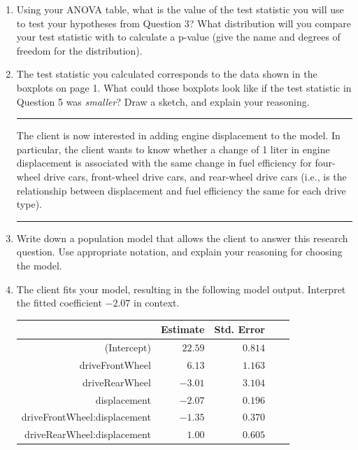 \documentclass[11pt]{article}
\begin{document}
\begin{enumerate}
\vspace{5cm}

\item Using your ANOVA table, what is the value of the test statistic you will use to test your hypotheses from Question 3? What distribution will you compare your test statistic with to calculate a p-value (give the name and degrees of freedom for the distribution).

\vspace{3cm}

\item The test statistic you calculated corresponds to the data shown in the boxplots on page 1. What could those boxplots look like if the test statistic in Question 5 was \textit{smaller}? Draw a sketch, and explain your reasoning.

\pagebreak

\rule{\textwidth}{1pt}

The client is now interested in adding engine displacement to the model. In particular, the client wants to know whether a change of 1 liter in engine displacement is associated with the same change in fuel efficiency for four-wheel drive cars, front-wheel drive cars, and rear-wheel drive cars (i.e., is the relationship between displacement and fuel efficiency the same for each drive type).

\rule{\textwidth}{1pt}

\item Write down a population model that allows the client to answer this research question. Use appropriate notation, and explain your reasoning for choosing the model.

\vspace{3cm}

\item The client fits your model, resulting in the following model output. Interpret the fitted coefficient $-2.07$ in context.

\begin{center}
\begin{tabular}{rrrrr}
  \hline
             & Estimate & Std. Error \\
  \hline
(Intercept)    & $22.59$ & $0.814$    \\
 driveFrontWheel    & $6.13$ & $1.163$ \\
 driveRearWheel & $-3.01$ & $3.104$ \\
 displacement & $-2.07$ & $0.196$ \\
 driveFrontWheel:displacement & $-1.35$ & $0.370$ \\
 driveRearWheel:displacement & $1.00$ & $0.605$ \\
  \hline
\end{tabular}
\end{center}


\end{enumerate}
\end{document}
